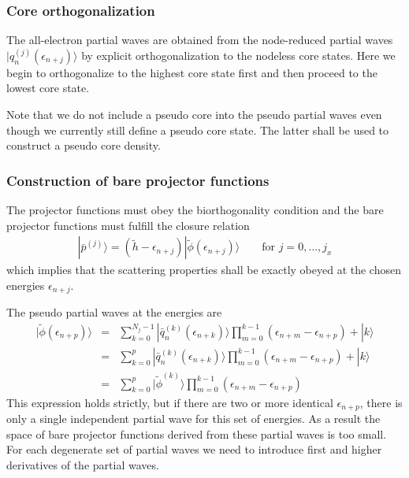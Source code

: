 \documentclass[11pt,a4paper]{report}
\begin{document}
\subsubsection{Core orthogonalization}
The all-electron partial waves are obtained from the node-reduced
partial waves $|q_n^{(j)}(\epsilon_{n+j})\rangle$ by explicit
orthogonalization to the nodeless core states. Here we begin to
orthogonalize to the highest core state first and then proceed to the
lowest core state.

Note that we do not include a pseudo core into the pseudo partial
waves even though we currently still define a pseudo core state. The
latter shall be used to construct a pseudo core density.

\subsubsection{Construction of bare projector functions}
The projector functions must obey the biorthogonality condition and
the bare projector functions must fulfill the closure relation
\begin{eqnarray}
|\bar{p}^{(j)}\rangle=(\tilde{h}-\epsilon_{n+j})
|\tilde{\phi}(\epsilon_{n+j})\rangle \qquad\text{for $j=0,\ldots,j_x$}
\end{eqnarray}
which implies that the scattering properties shall be exactly obeyed at
the chosen energies $\epsilon_{n+j}$.

The pseudo partial waves at the energies are
\begin{eqnarray}
|\tilde{\phi}(\epsilon_{n+p})\rangle
&=&
\sum_{k=0}^{N_j-1}|\bar{q}_n^{(k)}(\epsilon_{n+k})\rangle
\prod_{m=0}^{k-1}(\epsilon_{n+m}-\epsilon_{n+p})+|k\rangle
\nonumber\\
&=&\sum_{k=0}^{p}|\bar{q}_n^{(k)}(\epsilon_{n+k})\rangle
\prod_{m=0}^{k-1}(\epsilon_{n+m}-\epsilon_{n+p})+|k\rangle
\nonumber\\
&=&\sum_{k=0}^{p}|\tilde{\phi}^{(k)}\rangle
\prod_{m=0}^{k-1}(\epsilon_{n+m}-\epsilon_{n+p})
\end{eqnarray}
This expression holds strictly, but if there are two or more identical
$\epsilon_{n+p}$, there is only a single independent partial wave for
this set of energies. As a result the space of bare projector
functions derived from these partial waves is too small. For each
degenerate set of partial waves we need to introduce first and higher
derivatives of the partial waves.
\end{document}
